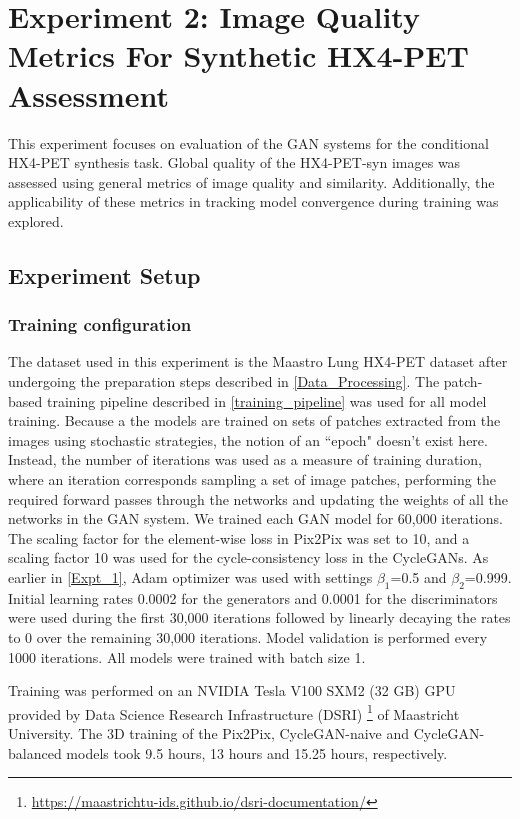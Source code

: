 \section{Experiment 2: Image Quality Metrics For Synthetic HX4-PET Assessment}
\label{Expt_2}
This experiment focuses on evaluation of the GAN systems for the conditional HX4-PET synthesis task. Global quality of the HX4-PET-syn images was assessed using general metrics of image quality and similarity. Additionally, the applicability of these metrics in tracking model convergence during training was explored.


\subsection{Experiment Setup}

\subsubsection{Training configuration}
The dataset used in this experiment is the Maastro Lung HX4-PET dataset after undergoing the preparation steps described in \ref{Data_Processing}. The patch-based training pipeline described in \ref{training_pipeline} was used for all model training. Because a the models are trained on sets of patches extracted from the images using stochastic strategies, the notion of an ``epoch" doesn't exist here. Instead, the number of iterations was used as a measure of training duration, where an iteration corresponds sampling a set of image patches, performing the required forward passes through the networks and updating the weights of all the networks in the GAN system. We trained each GAN model for 60,000 iterations. The scaling factor for the element-wise loss in Pix2Pix was set to 10, and a scaling factor 10 was used for the cycle-consistency loss in the CycleGANs. As earlier in \ref{Expt_1}, Adam optimizer was used with settings $\beta_1$=0.5 and $\beta_2$=0.999. Initial learning rates 0.0002 for the generators and 0.0001 for the discriminators were used during the first 30,000 iterations followed by linearly decaying the rates to 0 over the remaining 30,000 iterations. Model validation is performed every 1000 iterations. All models were trained with batch size 1.

Training was performed on an NVIDIA Tesla V100 SXM2 (32 GB) GPU provided by Data Science Research Infrastructure (DSRI) \footnote{\url{https://maastrichtu-ids.github.io/dsri-documentation/}} of Maastricht University. The 3D training of the Pix2Pix, CycleGAN-naive and CycleGAN-balanced models took 9.5 hours, 13 hours and 15.25 hours, respectively. 


